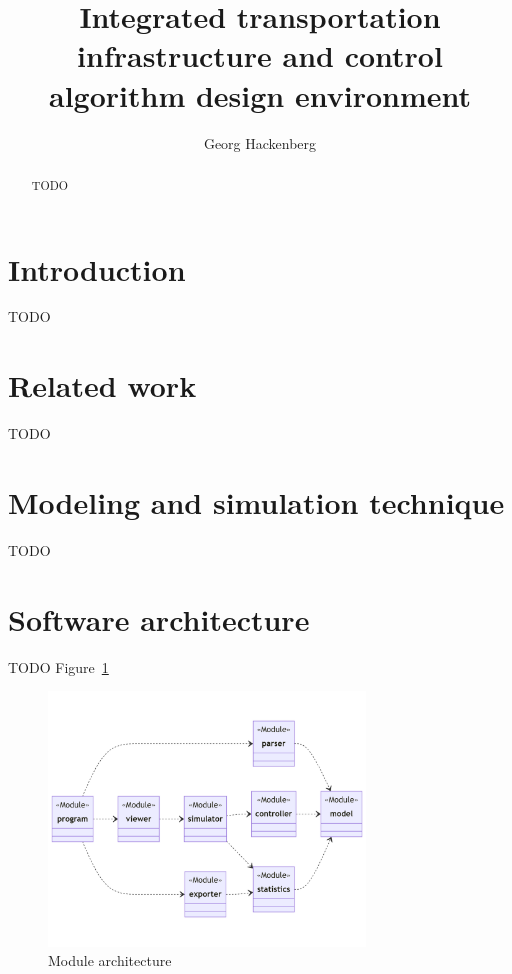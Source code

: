 \documentclass{article}
\begin{document}
    \title{Integrated transportation infrastructure and control algorithm design environment}
    \author{Georg Hackenberg}
    \maketitle
    
    \begin{abstract}
        TODO
    \end{abstract}
    
    \section{Introduction}
    TODO~\cite{key}

    \section{Related work}
    TODO

    \section{Modeling and simulation technique}
    TODO

    \section{Software architecture}
    TODO Figure~\ref{fig:0}

    \begin{figure}
        \centering
        \includegraphics[width=0.75\textwidth]{../../diagrams/architecture.png}
        \caption{Module architecture}
        \label{fig:0}
    \end{figure}
\end{document}
